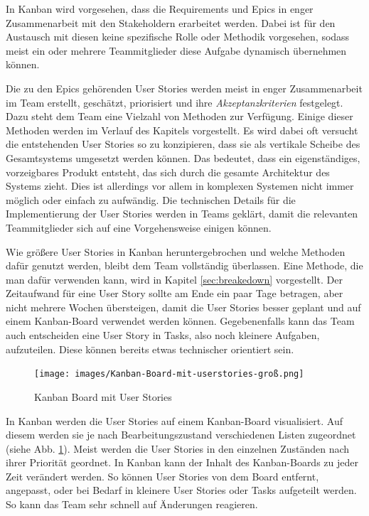 \documentclass[acmtog]{acmart}
\begin{document}
In Kanban wird vorgesehen, dass die Requirements und Epics in enger Zusammenarbeit mit 
den Stakeholdern erarbeitet werden. Dabei ist für den Austausch mit diesen keine 
spezifische Rolle oder Methodik vorgesehen, sodass meist ein oder mehrere Teammitglieder 
diese Aufgabe dynamisch übernehmen können. \cite{agileprocesses}

Die zu den Epics gehörenden User Stories werden meist in enger Zusammenarbeit im Team erstellt, 
geschätzt, priorisiert und ihre \emph{Akzeptanzkriterien} festgelegt. Dazu steht dem Team eine Vielzahl 
von Methoden zur Verfügung. Einige dieser Methoden werden im Verlauf des Kapitels vorgestellt. 
Es wird dabei oft versucht die entstehenden User Stories so zu konzipieren, dass sie als vertikale 
Scheibe des Gesamtsystems umgesetzt werden können. Das bedeutet, dass ein eigenständiges, vorzeigbares 
Produkt entsteht, das sich durch die gesamte Architektur des Systems zieht. Dies ist allerdings 
vor allem in komplexen Systemen nicht immer möglich oder einfach zu aufwändig. Die technischen Details für die Implementierung 
der User Stories werden in Teams geklärt, damit die relevanten Teammitglieder sich auf eine Vorgehensweise 
einigen können. \cite{agileprocesses}

Wie größere User Stories in Kanban heruntergebrochen und welche Methoden dafür genutzt werden, bleibt 
dem Team vollständig überlassen. Eine Methode, die man dafür verwenden kann, wird in Kapitel \ref{sec:breakedown} vorgestellt. 
Der Zeitaufwand für eine User Story sollte am Ende ein paar Tage betragen, aber nicht mehrere Wochen übersteigen, damit die User Stories besser 
geplant und auf einem Kanban-Board verwendet werden können. Gegebenenfalls kann das Team auch entscheiden eine User Story in Tasks, also noch 
kleinere Aufgaben, aufzuteilen. Diese können bereits etwas technischer orientiert sein. \cite{agileprocesses}

\begin{figure}[t]
  \centering
  \texttt{[image: images/Kanban-Board-mit-userstories-groß.png]}
  \caption{Kanban Board mit User Stories}
    \label{fig:kanban-board}
  \Description{}
\end{figure}

In Kanban werden die User Stories auf einem Kanban-Board visualisiert. Auf diesem werden sie je nach Bearbeitungszustand verschiedenen 
Listen zugeordnet (siehe Abb. \ref{fig:kanban-board}). Meist werden die User Stories in den einzelnen 
Zuständen nach ihrer Priorität geordnet. In Kanban kann der Inhalt des Kanban-Boards zu jeder Zeit verändert werden. 
So können User Stories von dem Board entfernt, angepasst, oder bei Bedarf in kleinere User Stories oder Tasks aufgeteilt werden. So kann das Team sehr schnell 
auf Änderungen reagieren. \cite{agileprocesses}
\end{document}
